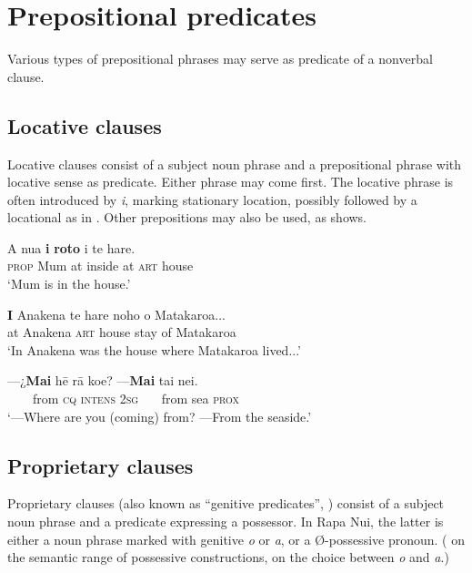 
\section{Prepositional predicates}\label{sec:9.4}

Various types of prepositional phrases may serve as predicate of a nonverbal clause.

\subsection{Locative clauses}\label{sec:9.4.1}
Locative clauses consist of a subject noun phrase and a prepositional phrase with locative sense as predicate. Either phrase may come first. The locative phrase is often introduced by \textit{{\ꞌ}i}, marking stationary location, possibly followed by a locational as in . Other prepositions may also be used, as  shows.

\ea\label{ex:9.81}
\gll A nua \textbf{{\ꞌ}i} \textbf{roto} i te hare. \\
\textsc{prop} Mum at inside at \textsc{art} house \\

\glt 
‘Mum is in the house.’ \textstyleExampleref{[R333.284]} 
\z

\ea\label{ex:9.82}
\gll \textbf{{\ꞌ}I} {\ꞌ}Anakena te hare noho o Matakaroa... \\
at Anakena \textsc{art} house stay of Matakaroa \\

\glt 
‘In Anakena was the house where Matakaroa lived...’ \textstyleExampleref{[Mtx-3-09.003]}
\z

\ea\label{ex:9.83}
\gll —¿\textbf{Mai} hē rā koe? —\textbf{Mai} tai nei.\\
~~~~from \textsc{cq} \textsc{intens} \textsc{2sg} ~~~from sea \textsc{prox}\\

\glt 
‘—Where are you (coming) from? —From the seaside.’ \textstyleExampleref{[R245.084]} 
\z
{}

\subsection{Proprietary clauses}\label{sec:9.4.2}
Proprietary clauses (also known as “genitive predicates”, \citealt[248]{Dryer2007Clause}) consist of a subject noun phrase and a predicate expressing a possessor. In Rapa Nui, the latter is either a noun phrase marked with genitive \textit{o} or \textit{{\ꞌ}a}, or a Ø-possessive pronoun. ( on the semantic range of possessive constructions,  on the choice between \textit{o} and \textit{{\ꞌ}a}.) 

